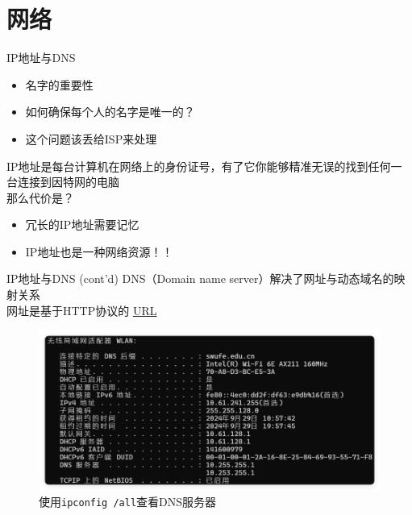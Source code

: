 \documentclass[aspectratio=1610]{beamer}
\begin{document}
\section{网络}

\begin{frame}[t]{IP地址与DNS}

    \begin{center}
        \begin{itemize}
            \item 名字的重要性
            \item 如何确保每个人的名字是唯一的？
            \item 这个问题该丢给ISP来处理
        \end{itemize}
    \end{center}

    \alert{IP地址}是每台计算机在网络上的身份证号，有了它你能够精准无误的找到任何一台连接到因特网的电脑 \\[1em]
    
    那么代价是？
    \begin{center}
        \begin{itemize}
            \item 冗长的IP地址需要记忆
            \item IP地址也是一种\alert{网络资源}！！
        \end{itemize}
    \end{center}
\end{frame}

\begin{frame}[t]{IP地址与DNS (cont'd)}
    \alert{DNS}（Domain name server）解决了网址与动态域名的映射关系 \\[1em]
    网址是基于HTTP协议的 \href{https://en.wikipedia.org/wiki/URL}{URL}
    
    \begin{figure}[htpb]
        \centering
        \includegraphics[height=0.6\textheight]{pic/DNS.png}
        \caption{使用\texttt{ipconfig /all}查看DNS服务器}
    \end{figure}
\end{frame}
\end{document}
